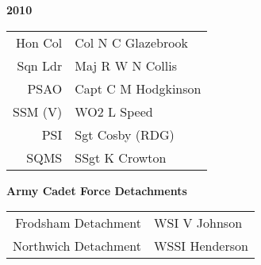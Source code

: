 \begin{center}
  \Huge
  \textbf{2010}
\end{center}

\begin{center}
  \small
  \begin{tabular}{rl}
    Hon Col & Col N C Glazebrook \\
    Sqn Ldr & Maj R W N Collis \\
    PSAO & Capt C M Hodgkinson \\
    SSM (V) & WO2 L Speed \\
    PSI & Sgt Cosby (RDG) \\
    SQMS & SSgt K Crowton \\
  \end{tabular}
\end{center}

\begin{center}
  \large
  \textbf{Army Cadet Force Detachments}
\end{center}

\begin{center}
  \small
  \begin{tabular}{rl}
    Frodsham Detachment & WSI V Johnson \\
    Northwich Detachment & WSSI Henderson \\
  \end{tabular}
\end{center}

\vspace{75mm}

\pagebreak
